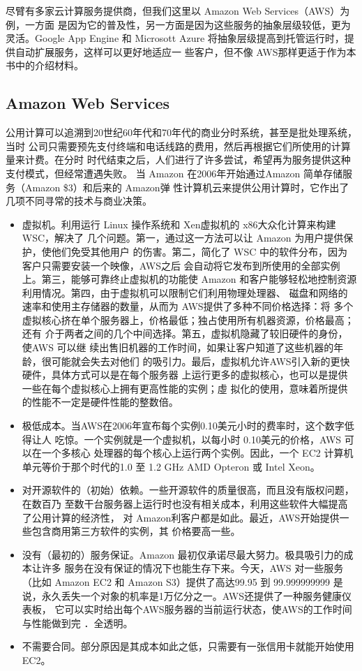 尽臂有多家云计算服务提供商，但我们这里以 Amazon Web Services（AWS）为例，一方面
是因为它的普及性，另一方面是因为这些服务的抽象层级较低，更为灵活。Google App Engine
和 Microsott Azure 将抽象层级提高到托管运行时，提供自动扩展服务，这样可以更好地适应一
些客户，但不像 AWS那样更适于作为本书中的介绍材料。

\subsection{Amazon Web Services}
公用计算可以追溯到20世纪60年代和70年代的商业分时系统，甚至是批处理系统，当时
公司只需要预先支付终端和电话线路的费用，然后再根据它们所使用的计算量来计费。在分时
时代结束之后，人们进行了许多尝试，希望再为服务提供这种支付模式，但经常遭遇失败。
当 Amazon 在2006年开始通过Amazon 简单存储服务（Amazon \$3）和后来的 Amazon弹
性计算机云来提供公用计算时，它作出了几项不同寻常的技术与商业决策。

\begin{itemize}
    \item 虚拟机。利用运行 Linux 操作系统和 Xen虚拟机的 x86大众化计算来构建 WSC，解决了
    几个问题。第一，通过这一方法可以让 Amazon 为用户提供保护，使他们免受其他用户
    的伤害。第二，简化了 WSC 中的软件分布，因为客户只需要安装一个映像，AWS之后
    会自动将它发布到所使用的全部实例上。第三，能够可靠终止虚拟机的功能使 Amazon
    和客户能够轻松地控制资源利用情况。第四，由于虚拟机可以限制它们利用物理处理器、
    磁盘和网络的速率和使用主存储器的数量，从而为 AWS提供了多种不同价格选择：将
    多个虚拟核心挤在单个服务器上，价格最低；独占使用所有机器资源，价格最高；还有
    介于两者之间的几个中间选择。第五，虚拟机隐藏了较旧硬件的身份，使AWS 可以继
    续出售旧机器的工作时间，如果让客户知道了这些机器的年龄，很可能就会失去对他们
    的吸引力。最后，虚拟机允许AWS引入新的更快硬件，具体方式可以是在每个服务器
    上运行更多的虚拟核心，也可以是提供一些在每个虚拟核心上拥有更高性能的实例；虛
    拟化的使用，意味着所提供的性能不一定是硬件性能的整数倍。
    \item 极低成本。当AWS在2006年宣布每个实例0.10美元小时的费率时，这个数字低得让人
    吃惊。一个实例就是一个虚拟机，以每小时 0.10美元的价格，AWS 可以在一个多核心
    处理器的每个核心上运行两个实例。因此，一个 EC2 计算机单元等价于那个时代的1.0
    至 1.2 GHz AMD Opteron 或 Intel Xeon。
    \item 对开源软件的（初始）依赖。一些开源软件的质量很高，而且没有版权问题，在数百乃
    至数干台服务器上运行时也没有相关成本，利用这些软件大幅提高了公用计算的经济性，
    对 Amazon利客户都是如此。最近，AWS开始提供一些包含商用第三方软件的实例，其
    价格要高一些。
    \item 没有（最初的）服务保证。Amazon 最初仅承诺尽最大努力。极具吸引力的成本让许多
    服务在没有保证的情况下也能生存下来。今天，AWS 对一些服务（比如 Amazon EC2
    和 Amazon S3）提供了高达99.95%
    到 99.999999999%
    是说，永久丢失一个对象的机率是1万亿分之一。AWS还提供了一种服务健康仪表板，
    它可以实时给出每个AWS服务器的当前运行状态，使AWS的工作时间与性能做到完
    ．全透明。
    \item 不需要合同。部分原因是其成本如此之低，只需要有一张信用卡就能开始使用EC2。
\end{itemize}

